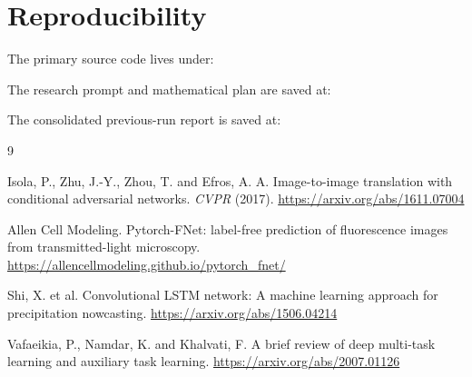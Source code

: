 \documentclass[11pt]{article}
\begin{document}
\section{Reproducibility}

The primary source code lives under:

\begin{center}
\small
{}
\end{center}

The research prompt and mathematical plan are saved at:

\begin{center}
\small
{}
\end{center}

The consolidated previous-run report is saved at:

\begin{center}
\small
{}
\end{center}

\begin{thebibliography}{9}

Isola, P., Zhu, J.-Y., Zhou, T. and Efros, A. A.
Image-to-image translation with conditional adversarial networks.
\textit{CVPR} (2017).
\url{https://arxiv.org/abs/1611.07004}

Allen Cell Modeling.
Pytorch-FNet: label-free prediction of fluorescence images from transmitted-light microscopy.
\url{https://allencellmodeling.github.io/pytorch_fnet/}

Shi, X. et al.
Convolutional LSTM network: A machine learning approach for precipitation nowcasting.
\url{https://arxiv.org/abs/1506.04214}

Vafaeikia, P., Namdar, K. and Khalvati, F.
A brief review of deep multi-task learning and auxiliary task learning.
\url{https://arxiv.org/abs/2007.01126}

\end{thebibliography}
\end{document}
